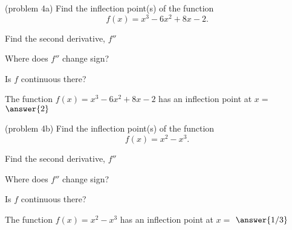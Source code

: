 \documentclass[handout]{ximera}
\begin{document}
\begin{example}[example 4]
\begin{image}
\end{image}

\end{example}


\begin{problem}(problem 4a)
  Find the inflection point(s) of the function
  \[
     f(x) = x^3 - 6x^2 + 8x - 2.
  \]
 
    \begin{hint}
      Find the second derivative, $f''$
    \end{hint}
    \begin{hint}
      Where does $f''$ change sign?
    \end{hint}
    \begin{hint}
      Is $f$ continuous there?
    \end{hint}    
		The function $f(x) = x^3 - 6x^2 + 8x - 2$ has an inflection point at $x =$
		 $\answer{2}$
	
\end{problem}


\begin{problem}(problem 4b)
  Find the inflection point(s) of the function
  \[
     f(x) = x^2 - x^3.
  \]
  
    \begin{hint}
      Find the second derivative, $f''$
    \end{hint}
    \begin{hint}
      Where does $f''$ change sign?
    \end{hint}
    \begin{hint}
      Is $f$ continuous there?
    \end{hint}    
		The function $f(x) = x^2 - x^3$ has an inflection point at $x =$
		 $\answer{1/3}$
		
\end{problem}
\end{document}
